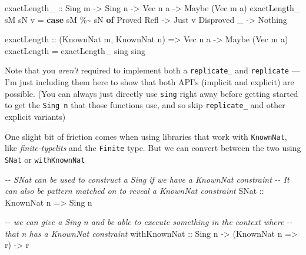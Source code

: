 \documentclass[]{article}
\newenvironment{Shaded}{}{}
\newcommand{\CommentTok}[1]{\textcolor[rgb]{0.38,0.63,0.69}{\textit{#1}}}
\newcommand{\DataTypeTok}[1]{\textcolor[rgb]{0.56,0.13,0.00}{#1}}
\newcommand{\KeywordTok}[1]{\textcolor[rgb]{0.00,0.44,0.13}{\textbf{#1}}}
\newcommand{\NormalTok}[1]{#1}
\newcommand{\OperatorTok}[1]{\textcolor[rgb]{0.40,0.40,0.40}{#1}}
\newcommand{\OtherTok}[1]{\textcolor[rgb]{0.00,0.44,0.13}{#1}}
\begin{document}
\begin{Shaded}
\begin{Highlighting}[]
\OtherTok{exactLength\_ ::} \DataTypeTok{Sing}\NormalTok{ m }\OtherTok{{-}\textgreater{}} \DataTypeTok{Sing}\NormalTok{ n }\OtherTok{{-}\textgreater{}} \DataTypeTok{Vec}\NormalTok{ n a }\OtherTok{{-}\textgreater{}} \DataTypeTok{Maybe}\NormalTok{ (}\DataTypeTok{Vec}\NormalTok{ m a)}
\NormalTok{exactLength\_ sM sN v }\OtherTok{=} \KeywordTok{case}\NormalTok{ sM }\OperatorTok{\%\textasciitilde{}}\NormalTok{ sN }\KeywordTok{of}
    \DataTypeTok{Proved} \DataTypeTok{Refl} \OtherTok{{-}\textgreater{}} \DataTypeTok{Just}\NormalTok{ v}
    \DataTypeTok{Disproved}\NormalTok{ \_  }\OtherTok{{-}\textgreater{}} \DataTypeTok{Nothing}

\OtherTok{exactLength ::}\NormalTok{ (}\DataTypeTok{KnownNat}\NormalTok{ m, }\DataTypeTok{KnownNat}\NormalTok{ n) }\OtherTok{=\textgreater{}} \DataTypeTok{Vec}\NormalTok{ n a }\OtherTok{{-}\textgreater{}} \DataTypeTok{Maybe}\NormalTok{ (}\DataTypeTok{Vec}\NormalTok{ m a)}
\NormalTok{exactLength }\OtherTok{=}\NormalTok{ exactLength\_ sing sing}
\end{Highlighting}
\end{Shaded}

Note that you \emph{aren't} required to implement both a \texttt{replicate\_}
and \texttt{replicate} --- I'm just including them here to show that both API's
(implicit and explicit) are possible. (You can always just directly use
\texttt{sing} right away before getting started to get the \texttt{Sing\ n} that
those functions use, and so skip \texttt{replicate\_} and other explicit
variants)

One slight bit of friction comes when using libraries that work with
\texttt{KnownNat}, like \emph{finite-typelits} and the \texttt{Finite} type. But
we can convert between the two using \texttt{SNat} or \texttt{withKnownNat}

\begin{Shaded}
\begin{Highlighting}[]
\CommentTok{{-}{-} SNat can be used to construct a \textasciigrave{}Sing\textasciigrave{} if we have a \textasciigrave{}KnownNat\textasciigrave{} constraint}
\CommentTok{{-}{-} It can also be pattern matched on to reveal a \textasciigrave{}KnownNat constraint\textasciigrave{}}
\DataTypeTok{SNat}\OtherTok{ ::} \DataTypeTok{KnownNat}\NormalTok{ n }\OtherTok{=\textgreater{}} \DataTypeTok{Sing}\NormalTok{ n}

\CommentTok{{-}{-} we can give a \textasciigrave{}Sing n\textasciigrave{} and be able to execute something in the context where}
\CommentTok{{-}{-} that \textasciigrave{}n\textasciigrave{} has a \textasciigrave{}KnownNat\textasciigrave{} constraint}
\OtherTok{withKnownNat ::} \DataTypeTok{Sing}\NormalTok{ n }\OtherTok{{-}\textgreater{}}\NormalTok{ (}\DataTypeTok{KnownNat}\NormalTok{ n }\OtherTok{=\textgreater{}}\NormalTok{ r) }\OtherTok{{-}\textgreater{}}\NormalTok{ r}
\end{Highlighting}
\end{Shaded}
\end{document}
